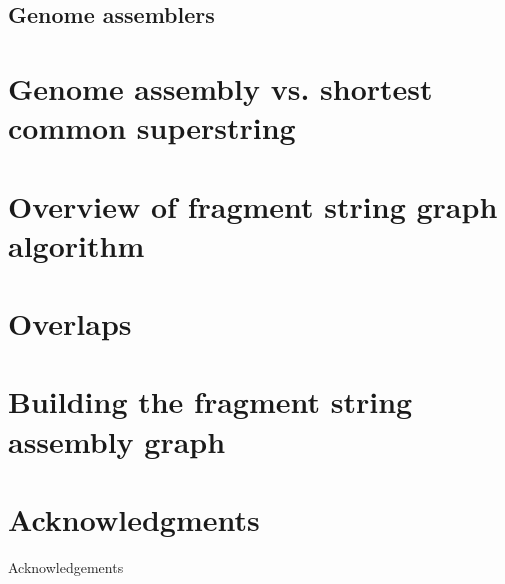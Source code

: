 \documentclass[10pt]{article}
\begin{document}
\subsection{Genome assemblers}

\section{Genome assembly vs. shortest common superstring}

\section{Overview of fragment string graph algorithm}

\section{Overlaps}

\section{Building the fragment string assembly graph}


\section*{Acknowledgments}

Acknowledgements



\end{document}
